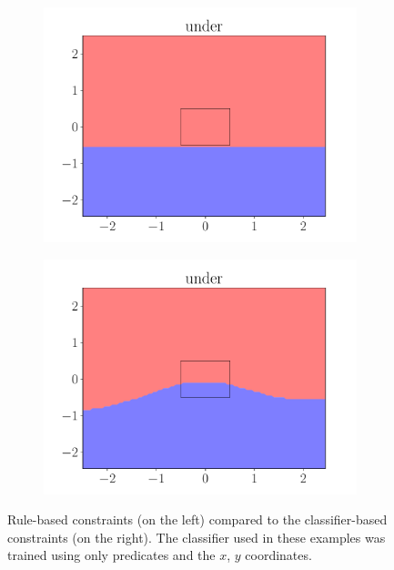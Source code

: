 \begin{figure}[ht]
\begin{subfigure}{0.45\textwidth}
            \includegraphics[width=\textwidth]{figures/under_rule.pdf}
        \end{subfigure}
        \begin{subfigure}{0.45\textwidth}
            \centering
            \includegraphics[width=\textwidth]{figures/under_predicate_only.pdf}
        \end{subfigure}
    \caption[Rule-based constraints compared to classifier-based constraints]{Rule-based constraints (on the left) compared to the classifier-based constraints (on the right). The classifier used in these examples was trained using only predicates and the $x$, $y$ coordinates.}
    \label{fig:boundaries:3}
\end{figure}

